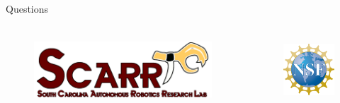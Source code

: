 \documentclass[10pt]{beamer}
\begin{document}
\begin{frame}{Questions}{}
  \begin{columns}
    \begin{column}{.6\textwidth}
      
        \begin{figure}
          \centering
          \includegraphics[height=1in]{figs/scarr-logo-ext.png}
        \end{figure}
      
    \end{column}
    \begin{column}{.3\textwidth}
      \begin{figure}
        \centering
        \includegraphics[height=1in]{figs/nsf1}
      \end{figure}
      
    \end{column}
  \end{columns} 
\end{frame}
\end{document}
